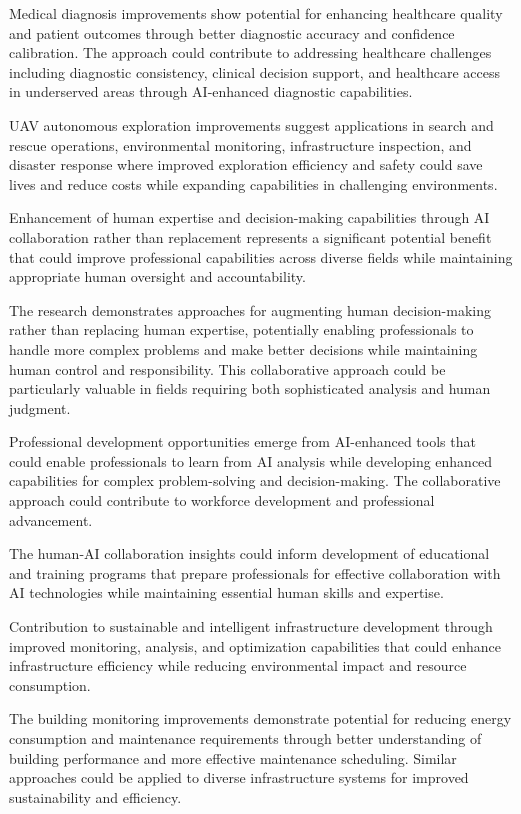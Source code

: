 Medical diagnosis improvements show potential for enhancing healthcare quality and patient outcomes through better diagnostic accuracy and confidence calibration. The approach could contribute to addressing healthcare challenges including diagnostic consistency, clinical decision support, and healthcare access in underserved areas through AI-enhanced diagnostic capabilities.

UAV autonomous exploration improvements suggest applications in search and rescue operations, environmental monitoring, infrastructure inspection, and disaster response where improved exploration efficiency and safety could save lives and reduce costs while expanding capabilities in challenging environments.

Enhancement of human expertise and decision-making capabilities through AI collaboration rather than replacement represents a significant potential benefit that could improve professional capabilities across diverse fields while maintaining appropriate human oversight and accountability.

The research demonstrates approaches for augmenting human decision-making rather than replacing human expertise, potentially enabling professionals to handle more complex problems and make better decisions while maintaining human control and responsibility. This collaborative approach could be particularly valuable in fields requiring both sophisticated analysis and human judgment.

Professional development opportunities emerge from AI-enhanced tools that could enable professionals to learn from AI analysis while developing enhanced capabilities for complex problem-solving and decision-making. The collaborative approach could contribute to workforce development and professional advancement.

The human-AI collaboration insights could inform development of educational and training programs that prepare professionals for effective collaboration with AI technologies while maintaining essential human skills and expertise.

Contribution to sustainable and intelligent infrastructure development through improved monitoring, analysis, and optimization capabilities that could enhance infrastructure efficiency while reducing environmental impact and resource consumption.

The building monitoring improvements demonstrate potential for reducing energy consumption and maintenance requirements through better understanding of building performance and more effective maintenance scheduling. Similar approaches could be applied to diverse infrastructure systems for improved sustainability and efficiency.


